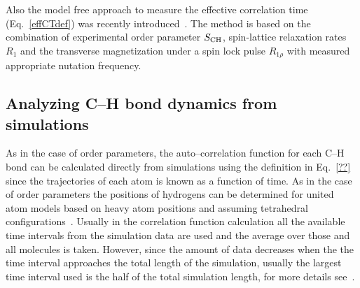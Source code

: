 \documentclass[aps,prl,superscriptaddress,twocolumn]{revtex4}
\begin{document}
Also the model free approach to measure the effective correlation time (Eq.~\ref{effCTdef}) was recently
introduced~\cite{ferreira15}. The method is based on the combination of experimental order parameter $S_{{\rm CH}}$,
spin-lattice relaxation rates $R_1$ and the transverse magnetization under a spin lock pulse $R_{1\rho}$ with measured 
appropriate nutation frequency.



\subsection{Analyzing C--H bond dynamics from simulations}

As in the case of order parameters, the auto--correlation function for each C--H bond can be
calculated directly from simulations using the definition in Eq.~\ref{??} since the trajectories of each atom is known
as a function of time. As in the case of order parameters the positions of hydrogens can be determined 
for united atom models based on heavy atom positions and assuming tetrahedral configurations~\cite{??}.
Usually in the correlation function calculation all the available time intervals from the 
simulation data are used and the average over those and all molecules is taken. However, since the 
amount of data decreases when the the time interval approaches the total length of the simulation,
usually the largest time interval used is the half of the total simulation length, for more details
see~\cite{gromacsMANUAL}.
\end{document}
